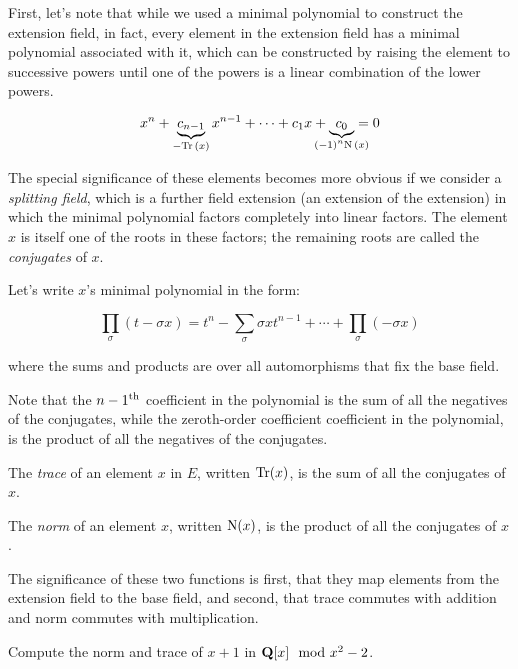 First, let's note that while we used a minimal polynomial to
construct the extension field,
in fact, every element in the extension field
has a minimal polynomial associated with it,
which can be constructed by raising the element to successive
powers until one of the powers is a linear combination
of the lower powers.

\begin{key point}
\huge
\begin{equation*}
x^n + \underbrace{c_{n-1}}_{- \Tr(x)} x^{n-1} + \cdots + c_1 x + \underbrace{c_0}_{\mathclap{(-1)^n \N(x)}} = 0
\end{equation*}
\end{key point}

The special significance of these elements becomes more obvious if we
consider a {\it splitting field}, which is a further field extension
(an extension of the extension) in which the minimal polynomial
factors completely into linear factors.  The element $x$ is
itself one of the roots in these factors; the remaining
roots are called the {\it conjugates} of $x$.

Let's write $x$'s minimal polynomial in the form:


$$\prod_\sigma \left( t - \sigma x \right) = t^n - \sum_\sigma \sigma x t^{n-1} + \cdots + \prod_\sigma (-\sigma x) $$

where the sums and products are over all automorphisms that fix the base field.

Note that the $n-1^{\rm th}$ coefficient in the polynomial is the sum
of all the negatives of the conjugates, while the zeroth-order
coefficient coefficient in the polynomial, is the product of all the
negatives of the conjugates.

The {\it trace} of an element $x$ in $E$, written ${\rm Tr}(x)$, is
the sum of all the conjugates of $x$.
\enddefinition

The {\it norm} of an element $x$, written ${\rm N}(x)$, is the product
of all the conjugates of $x$.
\enddefinition

The significance of these two functions is first, that they map
elements from the extension field to the base field, and second, that
trace commutes with addition and norm commutes with multiplication.

\example Compute the norm and trace of $x+1$ in ${\bf Q}[x] \mod x^2-2$.

